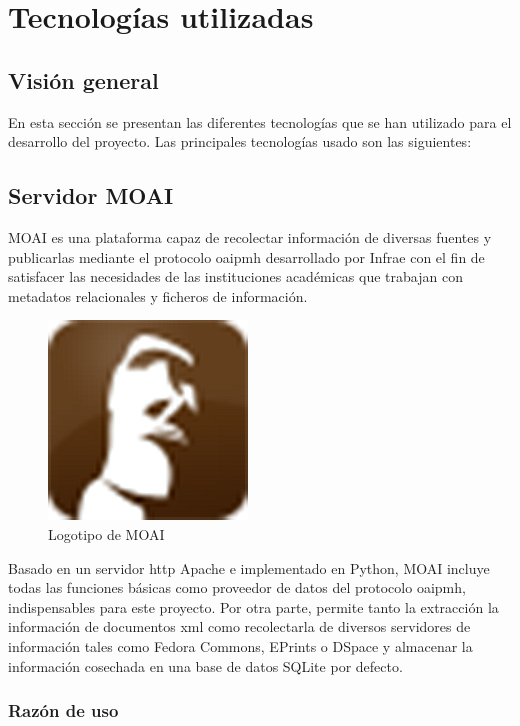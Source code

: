 \chapter{Tecnologías utilizadas}

\section{Visión general}

En esta sección se presentan las diferentes tecnologías que se han utilizado para el desarrollo del proyecto. Las principales tecnologías usado son las siguientes:

\section{Servidor MOAI}

MOAI\cite{MOAI} es una plataforma capaz de recolectar información de diversas fuentes y publicarlas mediante el protocolo \acrshort{oaipmh} desarrollado por Infrae\cite{Infrae} con el fin de satisfacer las necesidades de las instituciones académicas que trabajan con metadatos relacionales y ficheros de información.

\begin{figure}[!htbp]
	\centering
	\includegraphics{fig/moai_logo}
	\caption{Logotipo de MOAI}
\end{figure}

Basado en un servidor \acrshort{http} Apache\cite{HTTPApache} e implementado en Python, MOAI incluye todas las funciones básicas como proveedor de datos del protocolo \acrshort{oaipmh}, indispensables para este proyecto. Por otra parte, permite tanto la extracción la información de documentos \acrshort{xml} como recolectarla de diversos servidores de información tales como Fedora Commons\cite{Fedora}, EPrints\cite{EPrints} o DSpace\cite{DSpace} y almacenar la información cosechada en una base de datos SQLite\cite{SQLite} por defecto.

\subsection{Razón de uso}

